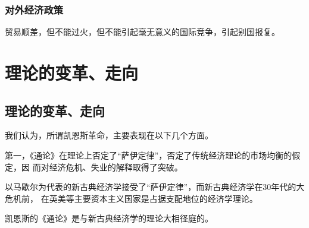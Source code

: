 \subsubsection{对外经济政策}

贸易顺差，但不能过火，但不能引起毫无意义的国际竞争，引起别国报复。

\section{理论的变革、走向}

\subsection{理论的变革、走向}

我们认为，所谓凯恩斯革命，主要表现在以下几个方面。

第一，《通论》在理论上否定了“萨伊定律”，否定了传统经济理论的市场均衡的假定，因
而对经济危机、失业的解释取得了突破。

以马歇尔为代表的新古典经济学接受了“萨伊定律”，而新古典经济学在30年代的大危机前，
在英美等主要资本主义国家是占据支配地位的经济学理论。

凯恩斯的《通论》是与新古典经济学的理论大相径庭的。

